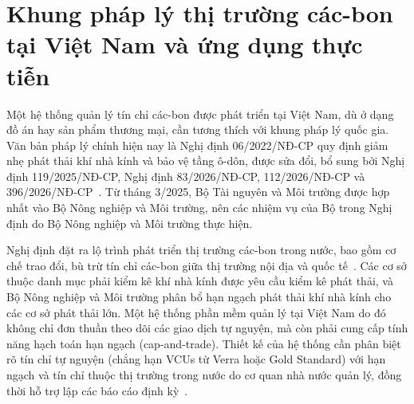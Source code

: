 \section{Khung pháp lý thị trường các-bon tại Việt Nam và ứng dụng thực tiễn}
\label{sec:vietnam}

Một hệ thống quản lý tín chỉ các-bon được phát triển tại Việt Nam, dù ở dạng đồ án hay sản phẩm thương mại, cần tương thích với khung pháp lý quốc gia. Văn bản pháp lý chính hiện nay là Nghị định 06/2022/NĐ-CP quy định giảm nhẹ phát thải khí nhà kính và bảo vệ tầng ô-dôn, được sửa đổi, bổ sung bởi Nghị định 119/2025/NĐ-CP, Nghị định 83/2026/NĐ-CP, 112/2026/NĐ-CP và 396/2026/NĐ-CP~\cite{vietnam2022nghidinh06}. Từ tháng 3/2025, Bộ Tài nguyên và Môi trường được hợp nhất vào Bộ Nông nghiệp và Môi trường, nên các nhiệm vụ của Bộ trong Nghị định do Bộ Nông nghiệp và Môi trường thực hiện.

Nghị định đặt ra lộ trình phát triển thị trường các-bon trong nước, bao gồm cơ chế trao đổi, bù trừ tín chỉ các-bon giữa thị trường nội địa và quốc tế~\cite{vietnam2022nghidinh06}. Các cơ sở thuộc danh mục phải kiểm kê khí nhà kính được yêu cầu kiểm kê phát thải, và Bộ Nông nghiệp và Môi trường phân bổ hạn ngạch phát thải khí nhà kính cho các cơ sở phát thải lớn. Một hệ thống phần mềm quản lý tại Việt Nam do đó không chỉ đơn thuần theo dõi các giao dịch tự nguyện, mà còn phải cung cấp tính năng hạch toán hạn ngạch (cap-and-trade). Thiết kế của hệ thống cần phân biệt rõ tín chỉ tự nguyện (chẳng hạn VCUs từ Verra hoặc Gold Standard) với hạn ngạch và tín chỉ thuộc thị trường trong nước do cơ quan nhà nước quản lý, đồng thời hỗ trợ lập các báo cáo định kỳ~\cite{vietnam2022nghidinh06}.


